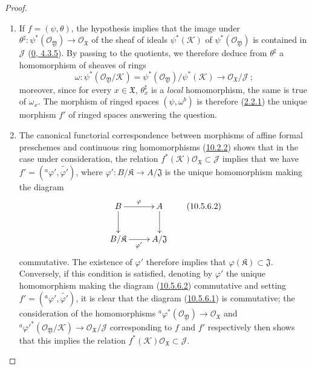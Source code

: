 \begin{proof}
\medskip\noindent
\begin{enumerate}
  \item[\rm{(i)}] If $f=(\psi,\theta)$, the hypothesis implies that
    the image under
    $\theta^\sharp:\psi^*(\mathscr{O}_{\mathfrak{Y}})\to
    \mathscr{O}_{\mathfrak{X}}$ of the sheaf of ideals
    $\psi^*(\mathscr{K})$ of $\psi^*(\mathscr{O}_{\mathfrak{Y}})$ is
    contained in $\mathscr{J}$
    (\hyperref[0.4.3.5]{0, 4.3.5}). By passing to the quotients, we
    therefore deduce from $\theta^\sharp$ a homomorphism of sheaves of rings
    \[
      \omega:\psi^*(\mathscr{O}_{\mathfrak{Y}}/\mathscr{K})
      =\psi^*(\mathscr{O}_{\mathfrak{Y}})/\psi^*(\mathscr{K})
      \to\mathscr{O}_{\mathfrak{X}}/\mathscr{J}~;
    \]
    moreover, since for every $x\in\mathfrak{X}$,
    $\theta_x^\sharp$ is a \emph{local} homomorphism, the same is true
    of $\omega_x$. The morphism of ringed spaces
    $(\psi,\omega^b)$ is therefore
    (\hyperref[I.2.2.1]{2.2.1}) the unique morphism $f'$ of ringed
    spaces answering the question.
  \item[\rm{(ii)}] The canonical functorial correspondence between
    morphisms of affine formal preschemes and continuous ring
    homomorphisms (\hyperref[I.10.2.2]{10.2.2}) shows that in the case
    under consideration, the relation
    $f^*(\mathscr{K})\mathscr{O}_{\mathfrak{X}}\subset\mathscr{J}$
    implies that we have
    $f'=({}^a\varphi',\widetilde{\varphi'})$, where
    $\varphi':B/\mathfrak{K}\to A/\mathfrak{J}$ is the unique
    homomorphism making the diagram
    \[
      \label{I.10.5.6.2}
      \xymatrix{
        B\ar[r]^\varphi\ar[d] & A\ar[d]\\
        B/\mathfrak{K}\ar[r]_{\varphi'} & A/\mathfrak{J}
      }
      \tag{10.5.6.2}
    \]
    commutative. The existence of $\varphi'$ therefore implies that
    $\varphi(\mathfrak{K})\subset\mathfrak{J}$. Conversely, if this
    condition is satisfied, denoting by $\varphi'$ the unique
    homomorphism making the diagram
    (\hyperref[I.10.5.6.2]{10.5.6.2}) commutative and setting
    $f'=({}^a\varphi',\widetilde{\varphi'})$, it is clear that the
    diagram (\hyperref[I.10.5.6.1]{10.5.6.1}) is commutative; the
    consideration of the homomorphisms
    ${}^a\varphi^*(\mathscr{O}_{\mathfrak{Y}})\to
    \mathscr{O}_{\mathfrak{X}}$ and
    ${}^a{\varphi'}^*(\mathscr{O}_{\mathfrak{Y}}/\mathscr{K})\to
    \mathscr{O}_{\mathfrak{X}}/\mathscr{J}$ corresponding to $f$ and
    $f'$ respectively then shows that this implies the relation
    $f^*(\mathscr{K})\mathscr{O}_{\mathfrak{X}}\subset\mathscr{J}$.
\end{enumerate}
\end{proof}

